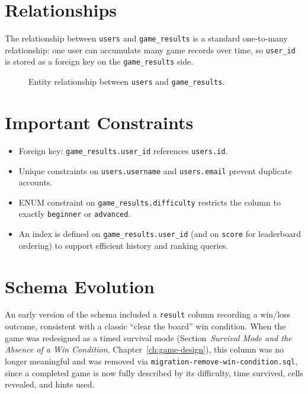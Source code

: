 \section{Relationships}
The relationship between \texttt{users} and \texttt{game\_results} is a
standard one-to-many relationship: one user can accumulate many game
records over time, so \texttt{user\_id} is stored as a foreign key on the
\texttt{game\_results} side.

\begin{figure}[h]
\centering
{}
\caption{Entity relationship between \texttt{users} and \texttt{game\_results}.}
\label{fig:er-diagram}
\end{figure}

\section{Important Constraints}
\begin{itemize}[nosep]
    \item Foreign key: \texttt{game\_results.user\_id} references
    \texttt{users.id}.
    \item Unique constraints on \texttt{users.username} and
    \texttt{users.email} prevent duplicate accounts.
    \item ENUM constraint on \texttt{game\_results.difficulty} restricts the
    column to exactly \texttt{beginner} or \texttt{advanced}.
    \item An index is defined on \texttt{game\_results.user\_id} (and on
    \texttt{score} for leaderboard ordering) to support efficient history
    and ranking queries.
\end{itemize}

\section{Schema Evolution}
An early version of the schema included a \texttt{result} column recording
a win/loss outcome, consistent with a classic ``clear the board'' win
condition. When the game was redesigned as a timed survival mode
(Section~\textit{Survival Mode and the Absence of a Win Condition},
Chapter~\ref{ch:game-design}), this column was no longer meaningful and was
removed via \texttt{migration-remove-win-condition.sql}, since a completed
game is now fully described by its difficulty, time survived, cells
revealed, and hints used.
